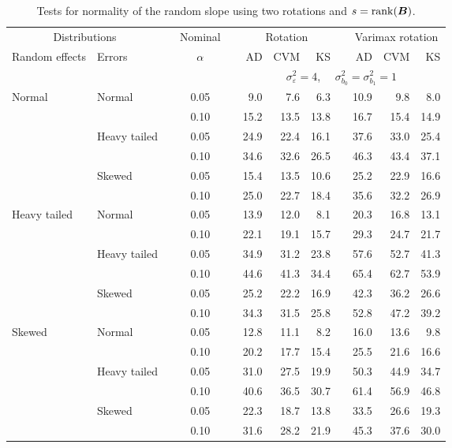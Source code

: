 

\begin{table}[ht]
\caption{\label{tab:simb1sB-alt}Tests for normality of the random slope using two rotations and $s = \operatorname{rank}(\bm{B})$.}
\begin{scriptsize}
\begin{center}
\begin{tabular}{ll p{.1cm} c p{.1cm} rrr p{.1cm} rrr}
  \hline
  \multicolumn{2}{c}{Distributions}& & Nominal & &  \multicolumn{3}{c}{Rotation} & & \multicolumn{3}{c}{Varimax rotation} \\ \cline{1-2} \cline{6-8} \cline{10-12}   
  Random effects & Errors & & $\alpha$ & & AD & CVM & KS & & AD & CVM & KS \\ 
   \hline
& && && \multicolumn{7}{c}{$\sigma_{\varepsilon}^2 = 4$, \ \ $\sigma_{b_0}^2 = \sigma_{b_1}^2 = 1$} \\ \cline{6-12}
Normal       & Normal       && 0.05 &&   9.0 & 7.6 & 6.3 &   & 10.9 & 9.8 & 8.0 \\ 
             &              && 0.10 &&   15.2 & 13.5 & 13.8 &   & 16.7 & 15.4 & 14.9 \\ 
             & Heavy tailed && 0.05 &&   24.9 & 22.4 & 16.1 &   & 37.6 & 33.0 & 25.4 \\ 
             &              && 0.10 &&   34.6 & 32.6 & 26.5 &   & 46.3 & 43.4 & 37.1 \\ 
             & Skewed       && 0.05 &&   15.4 & 13.5 & 10.6 &   & 25.2 & 22.9 & 16.6 \\ 
             &              && 0.10 &&   25.0 & 22.7 & 18.4 &   & 35.6 & 32.2 & 26.9 \\ 
Heavy tailed & Normal       && 0.05 &&   13.9 & 12.0 & 8.1 &   & 20.3 & 16.8 & 13.1 \\ 
             &              && 0.10 &&   22.1 & 19.1 & 15.7 &   & 29.3 & 24.7 & 21.7 \\ 
             & Heavy tailed && 0.05 &&   34.9 & 31.2 & 23.8 &   & 57.6 & 52.7 & 41.3 \\ 
             &              && 0.10 &&   44.6 & 41.3 & 34.4 &   & 65.4 & 62.7 & 53.9 \\ 
             & Skewed       && 0.05 &&   25.2 & 22.2 & 16.9 &   & 42.3 & 36.2 & 26.6 \\ 
             &              && 0.10 &&   34.3 & 31.5 & 25.8 &   & 52.8 & 47.2 & 39.2 \\ 
Skewed       & Normal       && 0.05 &&   12.8 & 11.1 & 8.2 &   & 16.0 & 13.6 & 9.8 \\ 
             &              && 0.10 &&   20.2 & 17.7 & 15.4 &   & 25.5 & 21.6 & 16.6 \\ 
             & Heavy tailed && 0.05 &&   31.0 & 27.5 & 19.9 &   & 50.3 & 44.9 & 34.7 \\ 
             &              && 0.10 &&   40.6 & 36.5 & 30.7 &   & 61.4 & 56.9 & 46.8 \\ 
             & Skewed       && 0.05 &&   22.3 & 18.7 & 13.8 &   & 33.5 & 26.6 & 19.3 \\ 
             &              && 0.10 &&   31.6 & 28.2 & 21.9 &   & 45.3 & 37.6 & 30.0 \\ 


\end{tabular}
\end{center}
\end{scriptsize}
\end{table}
